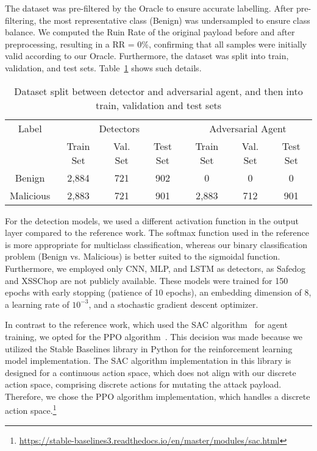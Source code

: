 The dataset was pre-filtered by the Oracle to ensure accurate labelling. After  pre-filtering, the most representative class (Benign) was undersampled to ensure class balance. We computed the Ruin Rate of the original payload before and after preprocessing, resulting in a RR = 0\%, confirming that all samples were initially valid according to our Oracle. Furthermore, the dataset was split into train, validation, and test sets. Table~\ref{tab:dataset} shows such details.


\begin{table}[!h]
\caption{Dataset split between detector and adversarial agent, and then into train, validation and test sets} \label{tab:dataset}
\centering

\begin{tabular}{c|ccc|ccc}
    \toprule
    Label &\multicolumn{3}{c|}{Detectors} & \multicolumn{3}{c}{Adversarial Agent}\\ & Train Set & Val. Set  & Test Set  & Train Set & Val. Set  & Test Set   \\
    \midrule
    Benign & 2,884   & 721 & 902 & 0 & 0 & 0 \\
    Malicious & 2,883   & 721 & 901 & 2,883 & 712 & 901 \\
    \bottomrule
\end{tabular}


\end{table}


For the detection models, we used a different  activation function in the output layer compared to the reference work. The softmax function used in the reference is more appropriate for multiclass classification, whereas our binary classification problem (Benign vs. Malicious) is better suited to the sigmoidal function. Furthermore, we employed only CNN, MLP, and LSTM as detectors, as Safedog and XSSChop are not publicly available. These models were trained for 150 epochs with early stopping (patience of 10 epochs), an embedding dimension of 8, a learning rate of $10^{-3}$, and a stochastic gradient descent optimizer.


In contrast to the reference work, which used the SAC algorithm~\cite{haarnoja2018soft} for agent training, we opted for the PPO algorithm~\cite{schulman2017proximal}. This decision was made because we utilized the Stable Baselines library in Python for the reinforcement learning model implementation. The SAC algorithm implementation in this library is designed for a continuous action space, which does not align with our discrete action space, comprising discrete actions for mutating the attack payload. Therefore, we chose the PPO algorithm implementation, which  handles a discrete action space.\footnote{\url{https://stable-baselines3.readthedocs.io/en/master/modules/sac.html}}


